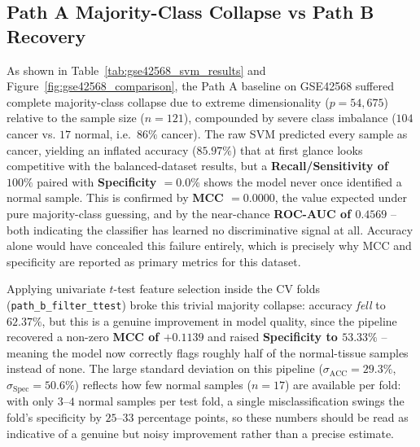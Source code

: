 \subsection{Path A Majority-Class Collapse vs Path B Recovery}

As shown in Table~\ref{tab:gse42568_svm_results} and Figure~\ref{fig:gse42568_comparison}, the Path A baseline on GSE42568 suffered complete majority-class collapse due to extreme dimensionality ($p=54{,}675$) relative to the sample size ($n=121$), compounded by severe class imbalance ($104$ cancer vs. $17$ normal, i.e.\ $86\%$ cancer). The raw SVM predicted every sample as cancer, yielding an inflated accuracy ($85.97\%$) that at first glance looks competitive with the balanced-dataset results, but a \textbf{Recall/Sensitivity of $100\%$} paired with \textbf{Specificity $=0.0\%$} shows the model never once identified a normal sample. This is confirmed by \textbf{MCC $= 0.0000$}, the value expected under pure majority-class guessing, and by the near-chance \textbf{ROC-AUC of $0.4569$} -- both indicating the classifier has learned no discriminative signal at all. Accuracy alone would have concealed this failure entirely, which is precisely why MCC and specificity are reported as primary metrics for this dataset.

Applying univariate $t$-test feature selection inside the CV folds (\texttt{path\_b\_filter\_ttest}) broke this trivial majority collapse: accuracy \emph{fell} to $62.37\%$, but this is a genuine improvement in model quality, since the pipeline recovered a non-zero \textbf{MCC of $+0.1139$} and raised \textbf{Specificity to $53.33\%$} -- meaning the model now correctly flags roughly half of the normal-tissue samples instead of none. The large standard deviation on this pipeline ($\sigma_{\text{ACC}} = 29.3\%$, $\sigma_{\text{Spec}} = 50.6\%$) reflects how few normal samples ($n=17$) are available per fold: with only $3$--$4$ normal samples per test fold, a single misclassification swings the fold's specificity by $25$--$33$ percentage points, so these numbers should be read as indicative of a genuine but noisy improvement rather than a precise estimate.

